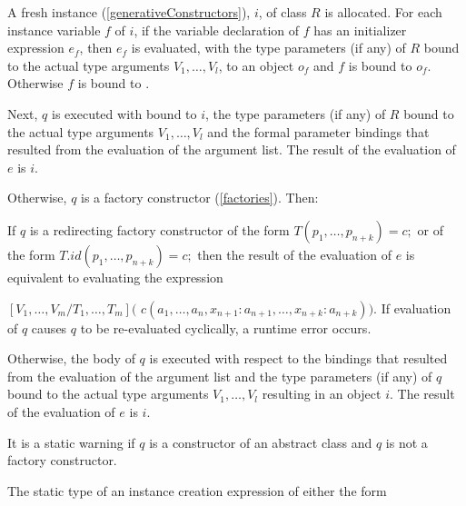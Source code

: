 \documentclass{article}
\newcommand{\code}[1]{{\sf #1}}
\begin{document}
\LMHash{}
A fresh instance (\ref{generativeConstructors}), $i$,  of class $R$ is allocated. For each instance variable $f$ of $i$,  if the variable declaration of $f$ has an initializer expression $e_f$, then $e_f$ is evaluated, with the type parameters (if any) of $R$ bound to the actual type arguments $V_1, \ldots, V_l$, to an object $o_f$ and $f$ is bound to $o_f$. Otherwise $f$ is bound to \NULL{}.


\LMHash{}
Next,  $q$ is executed  with \THIS{} bound to $i$,  the type parameters (if any) of $R$ bound to the actual type arguments $V_1, \ldots, V_l$ and the formal parameter bindings that resulted from the evaluation of the argument list. The result of the evaluation of $e$ is $i$.

\LMHash{}
Otherwise, $q$ is a factory constructor (\ref{factories}). Then:

\LMHash{}
If $q$ is a redirecting factory constructor of the form $T(p_1, \ldots, p_{n+k}) = c;$ or of the form  $T.id(p_1, \ldots, p_{n+k}) = c;$ then the result of the evaluation of $e$ is equivalent to evaluating the expression 

$[V_1,  \ldots, V_m/T_1,  \ldots, T_m]($\code{\NEW{} $c(a_1, \ldots, a_n, x_{n+1}: a_{n+1}, \ldots, x_{n+k}: a_{n+k}))$}.  If evaluation of $q$ causes $q$ to be re-evaluated cyclically, a runtime error occurs.


\LMHash{}
Otherwise, the body of $q$ is executed with respect to the bindings that resulted from the evaluation of the argument list and the type parameters (if any) of $q$ bound to the actual type arguments $V_1, \ldots, V_l$ resulting in an object $i$. The result of the evaluation of $e$ is $i$.

\LMHash{}
It is a static warning if $q$ is a constructor of an abstract class and $q$ is not a factory constructor.



\LMHash{}
The static type of an instance creation expression of either the form 
\end{document}
